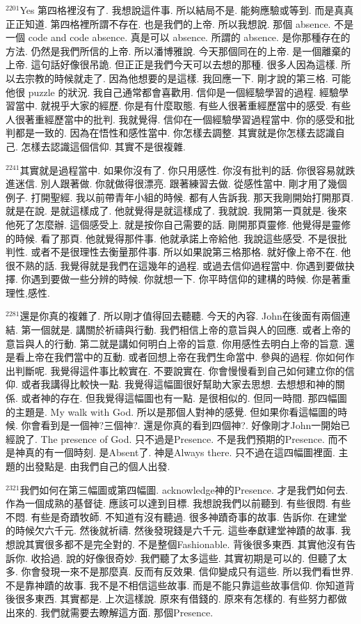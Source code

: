 \documentclass{book}
\begin{document}
$^{2201}$Yes 第四格裡沒有了.
我想說這件事.
所以結局不是.
能夠應驗或等到.
而是真真正正知道.
第四格裡所謂不存在.
也是我們的上帝.
所以我想說.
那個 absence.
不是一個 code and code absence.
真是可以 absence.
所謂的 absence.
是你那種存在的方法.
仍然是我們所信的上帝.
所以潘博雅說.
今天那個同在的上帝.
是一個離棄的上帝.
這句話好像很吊詭.
但正正是我們今天可以去想的那種.
很多人因為這樣.
所以去宗教的時候就走了.
因為他想要的是這樣.
我回應一下.
剛才說的第三格.
可能他很 puzzle 的狀況.
我自己通常都會喜歡用.
信仰是一個經驗學習的過程.
經驗學習當中.
就視乎大家的經歷.
你是有什麼取態.
有些人很著重經歷當中的感受.
有些人很著重經歷當中的批判.
我就覺得.
信仰在一個經驗學習過程當中.
你的感受和批判都是一致的.
因為在悟性和感性當中.
你怎樣去調整.
其實就是你怎樣去認識自己.
怎樣去認識這個信仰.
其實不是很複雜.

$^{2241}$其實就是過程當中.
如果你沒有了.
你只用感性.
你沒有批判的話.
你很容易就跌進迷信.
別人跟著做.
你就做得很漂亮.
跟著練習去做.
從感性當中.
剛才用了幾個例子.
打開聖經.
我以前帶青年小組的時候.
都有人告訴我.
那天我剛開始打開那頁.
就是在說.
是就這樣成了.
他就覺得是就這樣成了.
我就說.
我開第一頁就是.
後來他死了怎麼辦.
這個感受上.
就是按你自己需要的話.
剛開那頁靈修.
他覺得是靈修的時候.
看了那頁.
他就覺得那件事.
他就承諾上帝給他.
我說這些感受.
不是很批判性.
或者不是很理性去衡量那件事.
所以如果說第三格那格.
就好像上帝不在.
他很不熟的話.
我覺得就是我們在這幾年的過程.
或過去信仰過程當中.
你遇到要做抉擇.
你遇到要做一些分辨的時候.
你就想一下.
你平時信仰的建構的時候.
你是著重理性,感性.

$^{2281}$還是你真的複雜了.
所以剛才值得回去聽聽.
今天的內容.
John在後面有兩個連結.
第一個就是.
講關於祈禱與行動.
我們相信上帝的意旨與人的回應.
或者上帝的意旨與人的行動.
第二就是講如何明白上帝的旨意.
你用感性去明白上帝的旨意.
還是看上帝在我們當中的互動.
或者回想上帝在我們生命當中.
參與的過程.
你如何作出判斷呢.
我覺得這件事比較實在.
不要說實在.
你會慢慢看到自己如何建立你的信仰.
或者我講得比較快一點.
我覺得這幅圖很好幫助大家去思想.
去想想和神的關係.
或者神的存在.
但我覺得這幅圖也有一點.
是很相似的.
但同一時間.
那四幅圖的主題是.
My walk with God.
所以是那個人對神的感覺.
但如果你看這幅圖的時候.
你會看到是一個神?三個神?.
還是你真的看到四個神?.
好像剛才John一開始已經說了.
The presence of God.
只不過是Presence.
不是我們預期的Presence.
而不是神真的有一個時刻.
是Absent了.
神是Always there.
只不過在這四幅圖裡面.
主題的出發點是.
由我們自己的個人出發.

$^{2321}$我們如何在第三幅圖或第四幅圖.
acknowledge神的Presence.
才是我們如何去.
作為一個成熟的基督徒.
應該可以達到目標.
我想說我們以前聽到.
有些很悶.
有些不悶.
有些是奇蹟牧師.
不知道有沒有聽過.
很多神蹟奇事的故事.
告訴你.
在建堂的時候欠六千元.
然後就祈禱.
然後發現錢是六千元.
這些奉獻建堂神蹟的故事.
我想說其實很多都不是完全對的.
不是整個Fashionable.
背後很多東西.
其實他沒有告訴你.
收拾過.
說的好像很奇妙.
我們聽了太多這些.
其實初期是可以的.
但聽了太多.
你會發現一來不是那麼真.
反而有反效果.
信仰變成只有這些.
所以我們看世界.
不是靠神蹟的故事.
我不是不相信這些故事.
而是不能只靠這些故事信仰.
你知道背後很多東西.
其實都是.
上次這樣說.
原來有借錢的.
原來有怎樣的.
有些努力都做出來的.
我們就需要去瞭解這方面.
那個Presence.
\end{document}
